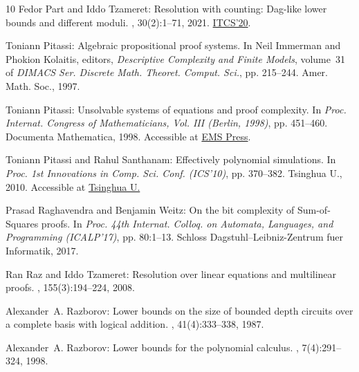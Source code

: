 \documentclass[11pt]{article}
\begin{document}
\begin{thebibliography}{10}
{\sc Fedor Part and Iddo Tzameret}: Resolution with counting: Dag-like lower
  bounds and different moduli.
, 30(2):1--71, 2021.
\newblock \prelim \href{https://doi.org/10.4230/LIPIcs.ITCS.2020.19}{ITCS'20}.
\newblock [\epfmtdoi{10.1007/s00037-020-00202-x}]

{\sc Toniann Pitassi}: Algebraic propositional proof systems.
\newblock In {\sc Neil Immerman and Phokion Kolaitis}, editors, {\em
  Descriptive Complexity and Finite Models}, volume~31 of {\em DIMACS Ser.
  Discrete Math. Theoret. Comput. Sci.}, pp. 215--244. Amer. Math. Soc., 1997.

{\sc Toniann Pitassi}: Unsolvable systems of equations and proof complexity.
\newblock In {\em Proc. Internat. Congress of Mathematicians, Vol. III (Berlin,
  1998)}, pp. 451--460. Documenta Mathematica, 1998.
\newblock Accessible at
  \href{https://ems.press/content/book-chapter-files/27258}{EMS Press}.

{\sc Toniann Pitassi and Rahul Santhanam}: Effectively polynomial simulations.
\newblock In {\em Proc. 1st Innovations in Comp. Sci. Conf. (ICS'10)}, pp.
  370--382. Tsinghua U., 2010.
\newblock Accessible at
  \href{https://conference.iiis.tsinghua.edu.cn/ICS2010/content/paper/Paper_29.pdf}{Tsinghua
  U.}

{\sc Prasad Raghavendra and Benjamin Weitz}: On the bit complexity of
  {Sum-of-Squares} proofs.
\newblock In {\em Proc. 44th Internat. Colloq. on Automata, Languages, and
  Programming (ICALP'17)}, pp. 80:1--13. Schloss Dagstuhl--Leibniz-Zentrum fuer
  Informatik, 2017.

{\sc Ran Raz and Iddo Tzameret}: Resolution over linear equations and
  multilinear proofs.
, 155(3):194--224, 2008.

{\sc Alexander~A. Razborov}: Lower bounds on the size of bounded depth circuits
  over a complete basis with logical addition.
,
  41(4):333--338, 1987.
\newblock [\epfmtdoi{10.1007/BF01137685}]

{\sc Alexander~A. Razborov}: Lower bounds for the polynomial calculus.
, 7(4):291--324, 1998.
\newblock [\epfmtdoi{10.1007/s000370050013}]


\end{thebibliography}
\end{document}
